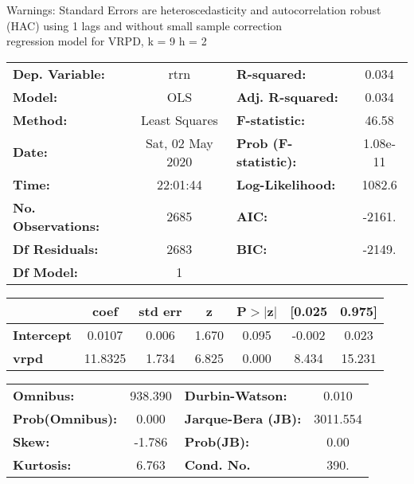 Warnings: \newline
 [1] Standard Errors are heteroscedasticity and autocorrelation robust (HAC) using 1 lags and without small sample correction\\ 

regression model for VRPD, k = 9 h = 2\begin{center}
\begin{tabular}{lclc}
\toprule
\textbf{Dep. Variable:}    &       rtrn       & \textbf{  R-squared:         } &     0.034   \\
\textbf{Model:}            &       OLS        & \textbf{  Adj. R-squared:    } &     0.034   \\
\textbf{Method:}           &  Least Squares   & \textbf{  F-statistic:       } &     46.58   \\
\textbf{Date:}             & Sat, 02 May 2020 & \textbf{  Prob (F-statistic):} &  1.08e-11   \\
\textbf{Time:}             &     22:01:44     & \textbf{  Log-Likelihood:    } &    1082.6   \\
\textbf{No. Observations:} &        2685      & \textbf{  AIC:               } &    -2161.   \\
\textbf{Df Residuals:}     &        2683      & \textbf{  BIC:               } &    -2149.   \\
\textbf{Df Model:}         &           1      & \textbf{                     } &             \\
\bottomrule
\end{tabular}
\begin{tabular}{lcccccc}
                   & \textbf{coef} & \textbf{std err} & \textbf{z} & \textbf{P$> |$z$|$} & \textbf{[0.025} & \textbf{0.975]}  \\
\midrule
\textbf{Intercept} &       0.0107  &        0.006     &     1.670  &         0.095        &       -0.002    &        0.023     \\
\textbf{vrpd}      &      11.8325  &        1.734     &     6.825  &         0.000        &        8.434    &       15.231     \\
\bottomrule
\end{tabular}
\begin{tabular}{lclc}
\textbf{Omnibus:}       & 938.390 & \textbf{  Durbin-Watson:     } &    0.010  \\
\textbf{Prob(Omnibus):} &   0.000 & \textbf{  Jarque-Bera (JB):  } & 3011.554  \\
\textbf{Skew:}          &  -1.786 & \textbf{  Prob(JB):          } &     0.00  \\
\textbf{Kurtosis:}      &   6.763 & \textbf{  Cond. No.          } &     390.  \\
\bottomrule
\end{tabular}
\end{center}

